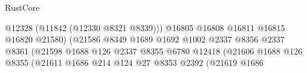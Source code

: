 \begin{lexlean}{RustCore}
\begin{coremodule}
                                                                @12328
                                                                (@11842 (@12330 @8321 @8339)))
                                                              @16805
                                                              @16808
                                                              @16811
                                                              @16815
                                                              @16820
                                                              @21580)
                                                            (@21586
                                                              @8349
                                                              @1689
                                                              @1692
                                                              @1002
                                                              @2337
                                                              @8356
                                                              @2337
                                                              @8361
                                                              (@21598
                                                                @1688
                                                                @126
                                                                @2337
                                                                @8355
                                                                @6780
                                                                @12418
                                                                (@21606
                                                                  @1688
                                                                  @126
                                                                  @8355
                                                                  (@21611
                                                                    @1686
                                                                    @214
                                                                    @124
                                                                    @27
                                                                    @8353
                                                                    @2392
                                                                    (@21619
                                                                      @1686

\end{coremodule}
\end{lexlean}
